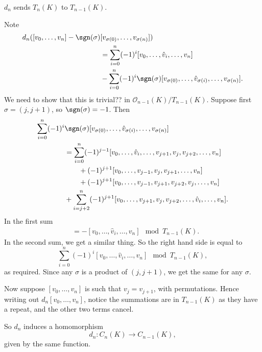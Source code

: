 \documentclass[12pt]{article}
\begin{document}
\begin{lemma}
	$d_n$ sends $T_n(K)$ to $T_{n-1}(K)$.
\end{lemma}

\begin{proofbox}
	Note
	\begin{align*}
		d_n([v_0, \ldots, v_n] - \sgn(\sigma) &[v_{\sigma(0)}, \ldots, v_{\sigma(n)}]) \\
		&= \sum_{i = 0}^n (-1)^{i}[v_0, \ldots, \hat v_i, \ldots, v_n] \\
											      &- \sum_{i = 0}^n (-1)^i \sgn(\sigma) [v_{\sigma(0)}, \ldots, \hat v_{\sigma(i)}, \ldots, v_{\sigma(n)}].
	\end{align*}
	We need to show that this is trivial?? in $\mathcal{O}_{n-1}(K) / T_{n-1}(K)$. Suppose first $\sigma=  (j, j+1)$, so $\sgn(\sigma) = -1$. Then
	\begin{align*}
		\sum_{i = 0}^n(-1)^i &\sgn(\sigma) [v_{\sigma(0)}, \ldots, \hat v_{\sigma(i)}, \ldots, v_{\sigma(n)}] \\
		&= \sum_{i = 0}^{n} (-1)^{j-1} [v_0, \ldots, \hat v_i, \ldots, v_{j+1}, v_j, v_{j+2}, \ldots, v_n] \\
														     & \qquad + (-1)^{j+1}[v_0, \ldots, v_{j-1}, v_{j}, v_{j+1}, \ldots, v_n] \\
														     &\qquad + (-1)^{j+1} [v_0, \ldots, v_{j-1}, v_{j+1}, v_{j+2}, v_j, \ldots, v_n] \\
														     &+ \sum_{i = j+2}^n (-1)^{j+1} [v_0, \ldots, v_{j+1}, v_j, v_{j+2}, \ldots, \hat v_i, \ldots, v_n].
	\end{align*}
	In the first sum
	\begin{align*}
		[v_0, \ldots, \hat v_i, \ldots, v_{j-1}, v_{j+1}, v_j, \ldots, v_{n}] &= - [v_0, \ldots, \hat v_i, \ldots, v_n] \mod T_{n-1}(K).
	\end{align*}
	In the second sum, we get a similar thing. So the right hand side is equal to
	\[
		\sum_{i = 0}^n(-1)^i [v_0, \ldots, \hat v_i, \ldots, v_n] \mod T_{n-1}(K),
	\]
	as required. Since any $\sigma$ is a product of $(j, j+1)$, we get the same for any $\sigma$.

	Now suppose $[v_0, \ldots, v_n]$ is such that $v_j = v_{j+1}$, with permutations. Hence writing out $d_{n}[v_0, \ldots, v_n]$, notice the summations are in $T_{n-1}(K)$ as they have a repeat, and the other two terms cancel.
\end{proofbox}

So $d_n$ induces a homomorphism
\[
d_n : C_n(K) \to C_{n-1}(K),
\]
given by the same function.
\end{document}
